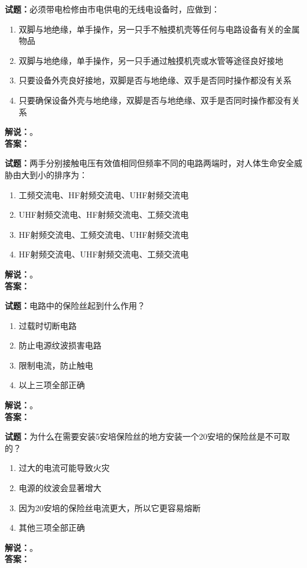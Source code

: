 \documentclass{ctexbook}
\begin{document}
\vspace{\baselineskip}

\noindent\textbf{试题：}必须带电检修由市电供电的无线电设备时，应做到：
\begin{enumerate}[leftmargin=3em]
  \item 双脚与地绝缘，单手操作，另一只手不触摸机壳等任何与电路设备有关的金属物品
  \item 双脚与地绝缘，单手操作，另一只手通过触摸机壳或水管等途径良好接地
  \item 只要设备外壳良好接地，双脚是否与地绝缘、双手是否同时操作都没有关系
  \item 只要确保设备外壳与地绝缘，双脚是否与地绝缘、双手是否同时操作都没有关系
\end{enumerate}
\noindent\textbf{解说：}\textbf{}。\\\noindent\textbf{答案：}

\vspace{\baselineskip}

\noindent\textbf{试题：}两手分别接触电压有效值相同但频率不同的电路两端时，对人体生命安全威胁由大到小的排序为：
\begin{enumerate}[leftmargin=3em]
  \item 工频交流电、HF射频交流电、UHF射频交流电
  \item UHF射频交流电、HF射频交流电、工频交流电
  \item HF射频交流电、工频交流电、UHF射频交流电
  \item HF射频交流电、UHF射频交流电、工频交流电
\end{enumerate}
\noindent\textbf{解说：}\textbf{}。\\\noindent\textbf{答案：}

\vspace{\baselineskip}

\noindent\textbf{试题：}电路中的保险丝起到什么作用？
\begin{enumerate}[leftmargin=3em]
  \item 过载时切断电路
  \item 防止电源纹波损害电路
  \item 限制电流，防止触电
  \item 以上三项全部正确
\end{enumerate}
\noindent\textbf{解说：}\textbf{}。\\\noindent\textbf{答案：}

\vspace{\baselineskip}

\noindent\textbf{试题：}为什么在需要安装5安培保险丝的地方安装一个20安培的保险丝是不可取的？
\begin{enumerate}[leftmargin=3em]
  \item 过大的电流可能导致火灾
  \item 电源的纹波会显著增大
  \item 因为20安培的保险丝电流更大，所以它更容易熔断
  \item 其他三项全部正确
\end{enumerate}
\noindent\textbf{解说：}\textbf{}。\\\noindent\textbf{答案：}
\end{document}
